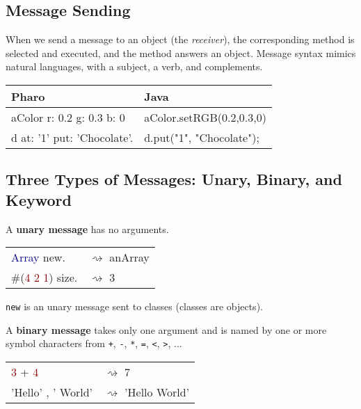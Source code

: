 \documentclass[notumble]{leaflet}
\newcommand{\code}[1]{\foreignlanguage{english}{\texttt{#1}}}
\begin{document}

\subsection{Message Sending}
When we send a message to an object (the \emph{receiver}), the corresponding method is selected and executed, and the method answers an object. Message syntax mimics natural languages, with a subject, a verb, and complements.



\noindent
\begin{tabularx}{\linewidth}{@{}lX@{}}
        \toprule
        \textbf{Pharo} & \textbf{Java}\\
\midrule
aColor r: 0.2 g: 0.3 b: 0&aColor.setRGB(0.2,0.3,0)\\
d at: '1' put: 'Chocolate'.&d.put("1", "Chocolate");\\
\midrule
\end{tabularx}

\vspace{-0.3cm}
\subsection{Three Types of Messages: Unary, Binary, and Keyword}

A \textbf{unary message} has no arguments.

\noindent
\begin{tabularx}{\linewidth}{@{}lX@{}}
        \toprule
      \textcolor{darkBlue}{Array} new.& $\rightsquigarrow$ anArray \\
      \#(\textcolor{darkRed}{4 2 1}) size.& $\rightsquigarrow$ 3\\
       \midrule
\end{tabularx}

\code{new} is an unary message sent to classes (classes are objects). 

A \textbf{binary message} takes only one
argument and is named by one or more symbol characters from \code{+}, \code{-}, \code{*}, \code{=}, \code{<}, \code{>}, ...

\noindent
\begin{tabularx}{\linewidth}{@{}lX@{}}
        \toprule
      \textcolor{darkRed}{3} + \textcolor{darkRed}{4}& $\rightsquigarrow$ 7 \\
     \textcolor{string}{'Hello'} , \textcolor{string}{' World'}& $\rightsquigarrow$ 'Hello World'\\
       \midrule
\end{tabularx}
\end{document}
